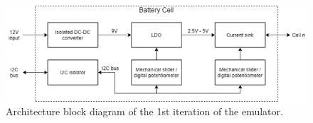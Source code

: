 \begin{figure}[h]
    \begin{center}
        \includegraphics[scale=0.5]{architecture_1st_iteration.png}
    \end{center}
    \caption{Architecture block diagram of the 1st iteration of the emulator.}
    \label{fig:1st_architecture}
\end{figure}
